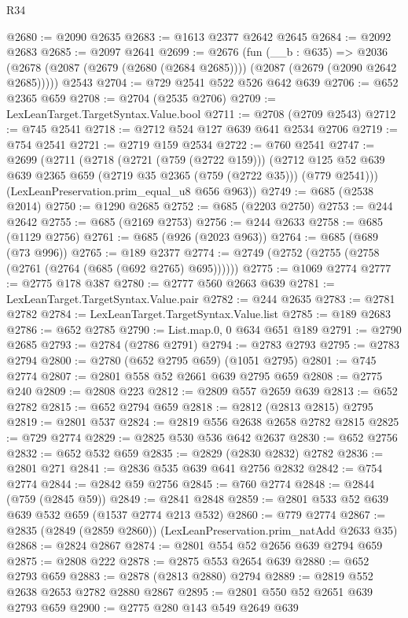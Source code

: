 \begin{lexlean}{R34}
\begin{coremodule}
@2680 := @2090 @2635
@2683 := @1613 @2377 @2642 @2645
@2684 := @2092 @2683
@2685 := @2097 @2641
@2699 := @2676
    (fun (__b : @635) =>
    @2036 (@2678 (@2087 (@2679 (@2680 (@2684 @2685)))) (@2087 (@2679 (@2090 @2642 @2685)))))
    @2543
@2704 := @729 @2541 @522 @526 @642 @639
@2706 := @652 @2365 @659
@2708 := @2704 (@2535 @2706)
@2709 := LexLeanTarget.TargetSyntax.Value.bool
@2711 := @2708 (@2709 @2543)
@2712 := @745 @2541
@2718 := @2712 @524 @127 @639 @641 @2534 @2706
@2719 := @754 @2541
@2721 := @2719 @159 @2534
@2722 := @760 @2541
@2747 := @2699
    (@2711
      (@2718
        (@2721 (@759 (@2722 @159)))
        (@2712 @125 @52 @639 @639 @2365 @659 (@2719 @35 @2365 (@759 (@2722 @35))) (@779 @2541)))
      (LexLeanPreservation.prim_equal_u8 @656 @963))
@2749 := @685 (@2538 @2014)
@2750 := @1290 @2685
@2752 := @685 (@2203 @2750)
@2753 := @244 @2642
@2755 := @685 (@2169 @2753)
@2756 := @244 @2633
@2758 := @685 (@1129 @2756)
@2761 := @685 (@926 (@2023 @963))
@2764 := @685 (@689 (@73 @996))
@2765 := @189 @2377
@2774 := @2749 (@2752 (@2755 (@2758 (@2761 (@2764 (@685 (@692 @2765) @695))))))
@2775 := @1069 @2774
@2777 := @2775 @178 @387
@2780 := @2777 @560 @2663 @639
@2781 := LexLeanTarget.TargetSyntax.Value.pair
@2782 := @244 @2635
@2783 := @2781 @2782
@2784 := LexLeanTarget.TargetSyntax.Value.list
@2785 := @189 @2683
@2786 := @652 @2785
@2790 := List.map.{0, 0} @634 @651 @189
@2791 := @2790 @2685
@2793 := @2784 (@2786 @2791)
@2794 := @2783 @2793
@2795 := @2783 @2794
@2800 := @2780 (@652 @2795 @659) (@1051 @2795)
@2801 := @745 @2774
@2807 := @2801 @558 @52 @2661 @639 @2795 @659
@2808 := @2775 @240
@2809 := @2808 @223
@2812 := @2809 @557 @2659 @639
@2813 := @652 @2782
@2815 := @652 @2794 @659
@2818 := @2812 (@2813 @2815) @2795
@2819 := @2801 @537
@2824 := @2819 @556 @2638 @2658 @2782 @2815
@2825 := @729 @2774
@2829 := @2825 @530 @536 @642 @2637
@2830 := @652 @2756
@2832 := @652 @532 @659
@2835 := @2829 (@2830 @2832) @2782
@2836 := @2801 @271
@2841 := @2836 @535 @639 @641 @2756 @2832
@2842 := @754 @2774
@2844 := @2842 @59 @2756
@2845 := @760 @2774
@2848 := @2844 (@759 (@2845 @59))
@2849 := @2841 @2848
@2859 := @2801 @533 @52 @639 @639 @532 @659 (@1537 @2774 @213 @532)
@2860 := @779 @2774
@2867 := @2835 (@2849 (@2859 @2860)) (LexLeanPreservation.prim_natAdd @2633 @35)
@2868 := @2824 @2867
@2874 := @2801 @554 @52 @2656 @639 @2794 @659
@2875 := @2808 @222
@2878 := @2875 @553 @2654 @639
@2880 := @652 @2793 @659
@2883 := @2878 (@2813 @2880) @2794
@2889 := @2819 @552 @2638 @2653 @2782 @2880 @2867
@2895 := @2801 @550 @52 @2651 @639 @2793 @659
@2900 := @2775 @280 @143 @549 @2649 @639

\end{coremodule}
\end{lexlean}
